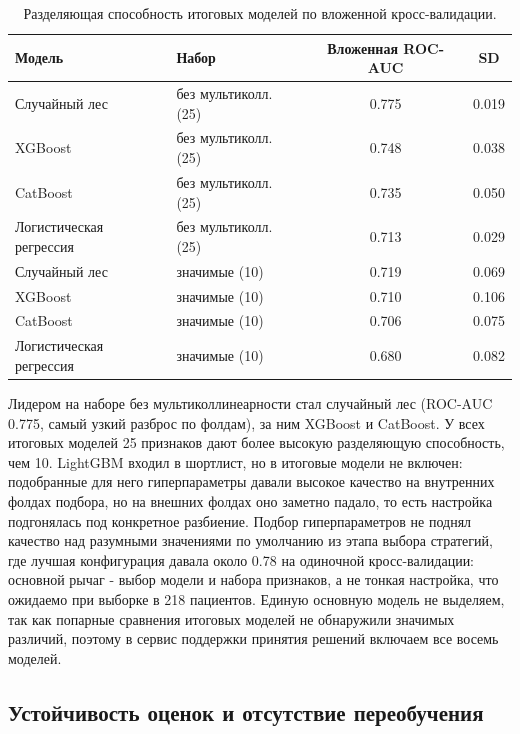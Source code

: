 \documentclass[12pt,a4paper]{article}
\begin{document}
\begin{table}[ht]
  \centering
  \caption{Разделяющая способность итоговых моделей по вложенной кросс-валидации.}
  \label{tab:cv}
  \begin{tabular}{l l c c}
    \toprule
    Модель & Набор & Вложенная ROC-AUC & SD \\
    \midrule
    Случайный лес & без мультиколл. (25) & 0.775 & 0.019 \\
    XGBoost & без мультиколл. (25) & 0.748 & 0.038 \\
    CatBoost & без мультиколл. (25) & 0.735 & 0.050 \\
    Логистическая регрессия & без мультиколл. (25) & 0.713 & 0.029 \\
    Случайный лес & значимые (10) & 0.719 & 0.069 \\
    XGBoost & значимые (10) & 0.710 & 0.106 \\
    CatBoost & значимые (10) & 0.706 & 0.075 \\
    Логистическая регрессия & значимые (10) & 0.680 & 0.082 \\
    \bottomrule
  \end{tabular}
\end{table}

Лидером на наборе без мультиколлинеарности стал случайный лес (ROC-AUC 0.775, самый узкий
разброс по фолдам), за ним XGBoost и CatBoost. У всех итоговых моделей 25 признаков дают
более высокую разделяющую способность, чем 10. LightGBM входил в шортлист, но в итоговые
модели не включен: подобранные для него гиперпараметры давали высокое качество на
внутренних фолдах подбора, но на внешних фолдах оно заметно падало, то есть настройка
подгонялась под конкретное разбиение. Подбор гиперпараметров не поднял качество над
разумными значениями по умолчанию из этапа выбора стратегий, где лучшая конфигурация давала
около 0.78 на одиночной кросс-валидации: основной рычаг - выбор модели и набора признаков, а
не тонкая настройка, что ожидаемо при выборке в 218 пациентов. Единую основную модель не
выделяем, так как попарные сравнения итоговых моделей не обнаружили значимых различий,
поэтому в сервис поддержки принятия решений включаем все восемь моделей.

\subsection{Устойчивость оценок и отсутствие переобучения}
\end{document}
